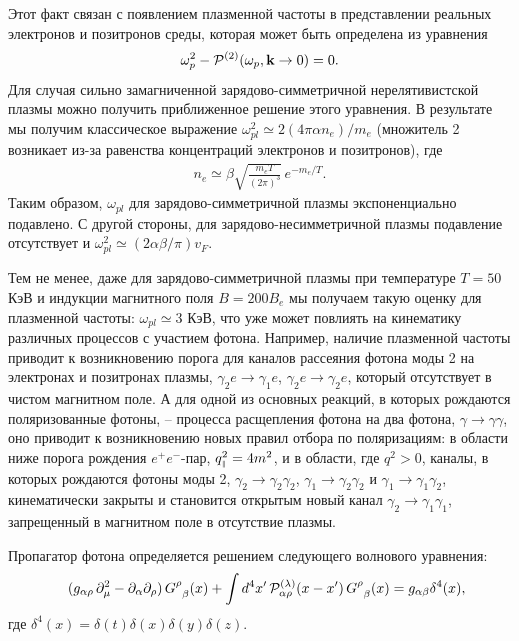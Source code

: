 Этот факт связан  с появлением плазменной частоты в представлении реальных электронов и позитронов среды, 
которая может быть определена из уравнения
%
\begin{equation}
\omega_{p}^2 - {\cal P}^{(2)} (\omega_{p}, {\mathbf k} \to 0 ) = 0.
\label{eq:omegapl}
\end{equation}
%
Для случая сильно замагниченной зарядово-симметричной нерелятивистской плазмы можно получить приближенное решение этого уравнения. В результате мы получим классическое выражение $\omega_{pl}^2 \simeq 2(4\pi \alpha n_{e})/m_e$ (множитель 2 возникает из-за равенства концентраций электронов и позитронов), где
%
\begin{eqnarray}
n_{e} \simeq \beta \sqrt{\frac{m_e T}{(2\pi)^3}}\,e^{-m_e/T}.
\label{eq:ne}
\end{eqnarray}
\noindent Таким образом, $\omega_{pl}$ для зарядово-симметричной плазмы экспоненциально подавлено. С другой стороны, для зарядово-несимметричной плазмы подавление отсутствует и $\omega_{pl}^2 \simeq (2\alpha \beta/\pi)v_F$.

Тем не менее, даже для зарядово-симметричной плазмы при температуре $T=50$ КэВ и индукции магнитного поля $B=200 B_e$ мы получаем такую оценку для плазменной частоты: $\omega_{pl} \simeq 3$ КэВ, что уже может повлиять на кинематику различных процессов с участием фотона. Например, наличие плазменной частоты приводит к возникновению порога для каналов рассеяния фотона моды 2 на электронах и позитронах плазмы, $\gamma_2 e \to \gamma_1 e$, $\gamma_2 e \to \gamma_2 e$, который отсутствует в чистом магнитном поле. А для одной из основных реакций, в которых рождаются поляризованные фотоны, -- процесса расщепления фотона на два фотона, $\gamma \to \gamma \gamma$, оно приводит к возникновению новых правил отбора по поляризациям: в области ниже порога рождения $e^+e^-$-пар, $q^2_{\mbox{\tiny $\|$}} = 4 m^2$, и в области, где $q^2 > 0$, каналы, в которых рождаются фотоны моды 2, $\gamma_2 \to \gamma_2 \gamma_2$,
$\gamma_1 \to \gamma_2 \gamma_2$ и $\gamma_1 \to \gamma_1 \gamma_2$, кинематически закрыты и становится открытым новый канал $\gamma_2 \to \gamma_1 \gamma_1$, запрещенный в магнитном поле в отсутствие плазмы.

Пропагатор фотона определяется решением следующего волнового уравнения:
\begin{eqnarray}\label{eq:WaveEq}
	\nonumber
	&& 
	(g_{\alpha \rho} \, \partial_{\mu}^2  -
	\partial_{\alpha}\partial_{\rho}) \, G^{\rho}_{\phantom{x}\beta}(x) + 
	\int d^4 x'\, {\cal P}^{(\lambda)}_{\alpha\rho} (x - x') \, 
	G^{\rho}_{\phantom{x}\beta}(x)
	\nonumber= g_{\alpha\beta}\delta^4(x),
	\label{eq:2}
\end{eqnarray}
где $\delta^4(x)=\delta(t)\delta(x)\delta(y)\delta(z)$. 

